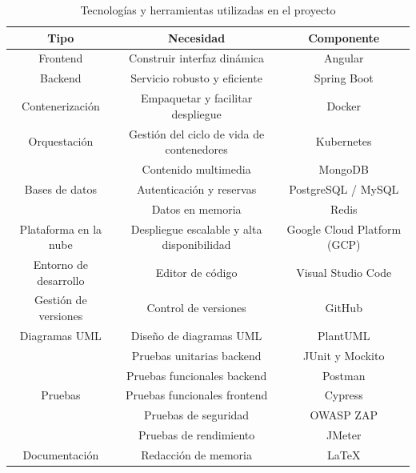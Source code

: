 \begin{table}[h!tb]
\centering
\begin{adjustbox}{width=0.9\textwidth}
\begin{scriptsize}
\begin{tabular}{|c|c|c|} \hline
\textbf{Tipo} & \textbf{Necesidad} & \textbf{Componente} \\ \hline
Frontend & Construir interfaz dinámica & Angular \\ \hline
Backend & Servicio robusto y eficiente & Spring Boot \\ \hline
Contenerización & Empaquetar y facilitar despliegue & Docker \\ \hline
Orquestación & Gestión del ciclo de vida de contenedores & Kubernetes \\ \hline
\multirow{3}{*}{Bases de datos} & Contenido multimedia & MongoDB \\ \cline{2-3}
 & Autenticación y reservas & PostgreSQL / MySQL \\ \cline{2-3}
 & Datos en memoria & Redis \\ \hline
Plataforma en la nube & Despliegue escalable y alta disponibilidad & Google Cloud Platform (GCP) \\ \hline
Entorno de desarrollo & Editor de código & Visual Studio Code \\ \hline
Gestión de versiones & Control de versiones & GitHub \\ \hline
Diagramas UML & Diseño de diagramas UML & PlantUML \\ \hline
\multirow{5}{*}{Pruebas} & Pruebas unitarias backend & JUnit y Mockito \\ \cline{2-3}
 & Pruebas funcionales backend & Postman \\ \cline{2-3}
 & Pruebas funcionales frontend & Cypress \\ \cline{2-3}
 & Pruebas de seguridad & OWASP ZAP \\ \cline{2-3}
 & Pruebas de rendimiento & JMeter \\ \hline
Documentación & Redacción de memoria & LaTeX \\ \hline
\end{tabular}
\end{scriptsize}
\end{adjustbox}

\caption{Tecnologías y herramientas utilizadas en el proyecto}
\label{tbl:tecnologias}
\end{table}
